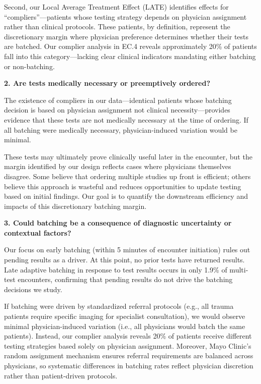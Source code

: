 \documentclass[11pt]{article}
\newcommand{\1}{\hbox{\rm 1\kern-.35em 1}}
\begin{document}
Second, our Local Average Treatment Effect (LATE) identifies effects for ``compliers''---patients whose testing strategy depends on physician assignment rather than clinical protocols. These patients, by definition, represent the discretionary margin where physician preference determines whether their tests are batched. Our complier analysis in EC.4 reveals approximately 20\% of patients fall into this category---lacking clear clinical indicators mandating either batching or non-batching.

\textbf{2. Are tests medically necessary or preemptively ordered?}

The existence of compliers in our data---identical patients whose batching decision is based on physician assignment not clinical necessity---provides evidence that these tests are not medically necessary at the time of ordering. If all batching were medically necessary, physician-induced variation would be minimal. 

These tests may ultimately prove clinically useful later in the encounter, but the margin identified by our design reflects cases where physicians themselves disagree. Some believe that ordering multiple studies up front is efficient; others believe this approach is wasteful and reduces opportunities to update testing based on initial findings. Our goal is to quantify the downstream efficiency and impacts of this discretionary batching margin.

\textbf{3. Could batching be a consequence of diagnostic uncertainty or contextual factors?}

Our focus on early batching (within 5 minutes of encounter initiation) rules out pending results as a driver. At this point, no prior tests have returned results. Late adaptive batching in response to test results occurs in only 1.9\% of multi-test encounters, confirming that pending results do not drive the batching decisions we study.

If batching were driven by standardized referral protocols (e.g., all trauma patients require specific imaging for specialist consultation), we would observe minimal physician-induced variation (i.e., all physicians would batch the same patients). Instead, our complier analysis reveals 20\% of patients receive different testing strategies based solely on physician assignment. Moreover, Mayo Clinic's random assignment mechanism ensures referral requirements are balanced across physicians, so systematic differences in batching rates reflect physician discretion rather than patient-driven protocols.
\end{document}
